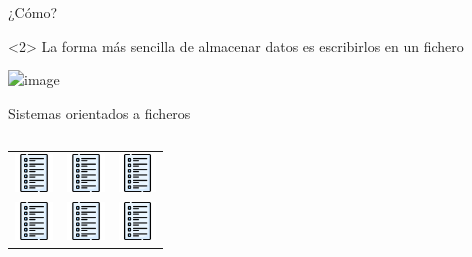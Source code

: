 
\begin{frame}{¿C\'omo?}
    \begin{block}<2>{}
        La forma m\'as sencilla de almacenar datos es escribirlos en un fichero
    \end{block}
    \vspace{5mm}

    \centering
    \includegraphics<2>[width=50mm, height=50mm]{img/csv.png}
\end{frame}


\begin{frame}{Sistemas orientados a ficheros}
   
    \begin{columns}[T]
        \begin{column}{0.30\linewidth}
            \begin{block}
                
                \begin{tabular}{c c c}
    
                    \includegraphics[width=1cm]{img/list.png}
                    
                    & \includegraphics[width=1cm]{img/list.png}
                    & \includegraphics[width=1cm]{img/list.png}\\
    
                    \includegraphics[width=1cm]{img/list.png}
                    & \includegraphics[width=1cm]{img/list.png}
                    & \includegraphics[width=1cm]{img/list.png}\\
    

\end{tabular}
\end{block}
\end{column}
\end{columns}
\end{frame}
